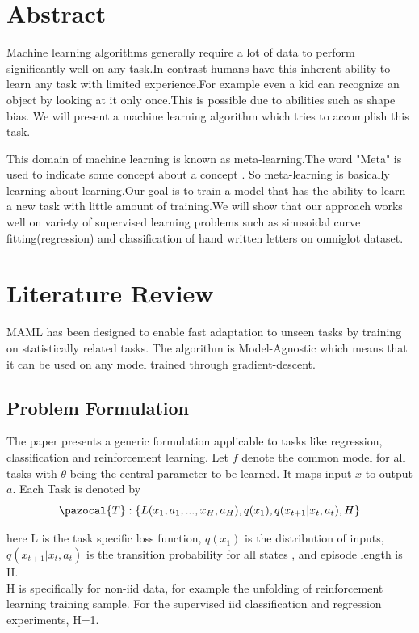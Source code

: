 \documentclass[a4paper]{article}
\newcommand{\Tb}{\pazocal{T}}
\begin{document}


\section{Abstract}

Machine learning algorithms generally require a lot of data to perform significantly well on any task.In contrast humans have this inherent ability to learn any task with limited experience.For example even a kid can recognize an object by looking at it only once.This is possible due to abilities such as shape bias. We will present a machine learning algorithm which tries to accomplish this task.

This domain of machine learning is known as meta-learning.The word "Meta" is used to indicate some concept about a concept . So meta-learning is basically learning about learning.Our goal is to train a model that has the ability to learn a new task with little amount of training.We will show that our approach works well on variety of supervised learning problems such as sinusoidal curve fitting(regression) and classification of hand written letters on omniglot dataset. 

\section{Literature Review}

MAML has been designed to enable fast adaptation to unseen tasks by training on statistically related tasks. The algorithm is Model-Agnostic which means that it can be used on any model trained through gradient-descent.

\subsection{Problem Formulation}
The paper presents a generic formulation applicable to tasks like regression, classification and reinforcement learning. Let $f$ denote the common model for all tasks with $\theta$ being the central parameter to be learned. It maps input $x$ to output $a$. Each Task is denoted by $$\Tb: \{{L}({x_1}, {a_1}, ... , {x_H}, {a_H}),q({x_1}),q({x_{t+1}}|{x_t,a_t}),H\}$$

here L is the task specific loss function, $q(x_1)$ is the distribution of inputs, $q(x_{t+1} |x_t,a_t )$ is the transition probability for all states , and episode length is H. \\
H is specifically for non-iid data, for example the unfolding of reinforcement learning training sample. For the supervised iid classification and regression experiments, H=1.
\end{document}

